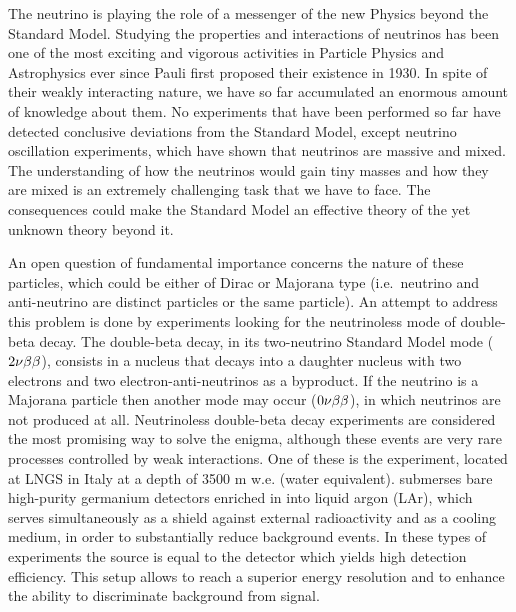 	The neutrino is playing the role of a messenger of the new Physics beyond the Standard Model. Studying the properties and interactions of neutrinos has been one of the most exciting and vigorous activities in Particle Physics and Astrophysics ever since Pauli first proposed their existence in 1930. In spite of their weakly interacting nature, we have so far accumulated an enormous amount of knowledge about them. No experiments that have been performed so far have detected conclusive deviations from the Standard Model, except neutrino oscillation experiments, which have shown that neutrinos are massive and mixed. The understanding of how the neutrinos would gain tiny masses and how they are mixed is an extremely challenging task that we have to face. The consequences could make the Standard Model an effective theory of the yet unknown theory beyond it.

	An open question of fundamental importance concerns the nature of these particles, which could be either of Dirac or Majorana type (i.e.~neutrino and anti-neutrino are distinct particles or the same particle). An attempt to address this problem is done by experiments looking for the neutrinoless mode of double-beta decay. The double-beta decay, in its two-neutrino Standard Model mode ($2\nu\beta\beta$), consists in a nucleus that decays into a daughter nucleus with two electrons and two electron-anti-neutrinos as a byproduct. If the neutrino is a Majorana particle then another mode may occur ($0\nu\beta\beta$), in which neutrinos are not produced at all. Neutrinoless double-beta decay experiments are considered the most promising way to solve the enigma, although these events are very rare processes controlled by weak interactions. One of these is the {\gerda} experiment, located at LNGS in Italy at a depth of 3500 m w.e. (water equivalent). {\gerda} submerses bare high-purity germanium detectors enriched in  into liquid argon (LAr), which serves simultaneously as a shield against external radioactivity and as a cooling medium, in order to substantially reduce background events. In these types of experiments the source is equal to the detector which yields high detection efficiency. This setup allows to reach a superior energy resolution and to enhance the ability to discriminate background from signal.

